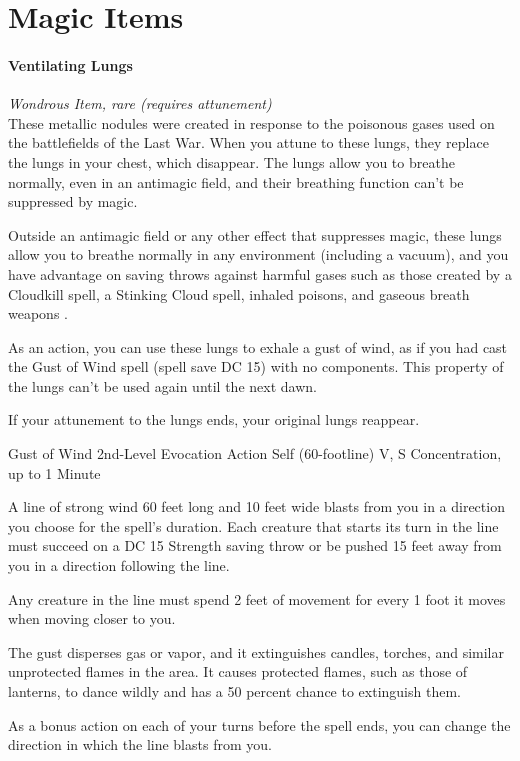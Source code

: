 \documentclass[letterpaper,openany,oneside,twocolumn]{book}
\begin{document}
\part*{Magic Items}

\subsection*{Ventilating Lungs}
\textit{Wondrous Item, rare (requires attunement)}\\
These metallic nodules were created in response to the poisonous gases used on the battlefields of the Last War. When you attune to these lungs, they replace the lungs in your chest, which disappear. The lungs allow you to breathe normally, even in an antimagic field, and their breathing function can't be suppressed by magic.

Outside an antimagic field or any other effect that suppresses magic, these lungs allow you to breathe normally in any environment (including a vacuum), and you have advantage on saving throws against harmful gases such as those created by a Cloudkill spell, a Stinking Cloud spell, inhaled poisons, and gaseous breath weapons .

As an action, you can use these lungs to exhale a gust of wind, as if you had cast the Gust of Wind spell (spell save DC 15) with no components. This property of the lungs can't be used again until the next dawn.

If your attunement to the lungs ends, your original lungs reappear.

\DndSpellHeader
  {Gust of Wind}
  {2nd-Level Evocation}
  {Action}
  {Self (60-footline)}
  {V, S}
  {Concentration, up to 1 Minute}

A line of strong wind 60 feet long and 10 feet wide blasts from you in a direction you choose for the spell's duration. Each creature that starts its turn in the line must succeed on a DC 15 Strength saving throw or be pushed 15 feet away from you in a direction following the line.

Any creature in the line must spend 2 feet of movement for every 1 foot it moves when moving closer to you.

The gust disperses gas or vapor, and it extinguishes candles, torches, and similar unprotected flames in the area. It causes protected flames, such as those of lanterns, to dance wildly and has a 50 percent chance to extinguish them.

As a bonus action on each of your turns before the spell ends, you can change the direction in which the line blasts from you.
\vfill\eject
\end{document}
